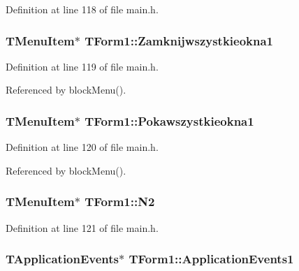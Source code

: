 Definition at line 118 of file main.h.\hypertarget{classTForm1_fbdc23537e25379aa4c73992641a843f}{
\subsubsection[Zamknijwszystkieokna1]{\setlength{\rightskip}{0pt plus 5cm}TMenuItem$\ast$ {\bf TForm1::Zamknijwszystkieokna1}}}
\label{classTForm1_fbdc23537e25379aa4c73992641a843f}




Definition at line 119 of file main.h.

Referenced by blockMenu().\hypertarget{classTForm1_7b4041d435033e2479bc5df13517e561}{
\subsubsection[Pokawszystkieokna1]{\setlength{\rightskip}{0pt plus 5cm}TMenuItem$\ast$ {\bf TForm1::Pokawszystkieokna1}}}
\label{classTForm1_7b4041d435033e2479bc5df13517e561}




Definition at line 120 of file main.h.

Referenced by blockMenu().\hypertarget{classTForm1_7572e947da6f9d95c11b3ec671dbede4}{
\subsubsection[N2]{\setlength{\rightskip}{0pt plus 5cm}TMenuItem$\ast$ {\bf TForm1::N2}}}
\label{classTForm1_7572e947da6f9d95c11b3ec671dbede4}




Definition at line 121 of file main.h.\hypertarget{classTForm1_85037aa8ea01d760f08123d791c416dd}{
\subsubsection[ApplicationEvents1]{\setlength{\rightskip}{0pt plus 5cm}TApplicationEvents$\ast$ {\bf TForm1::ApplicationEvents1}}}
\label{classTForm1_85037aa8ea01d760f08123d791c416dd}





